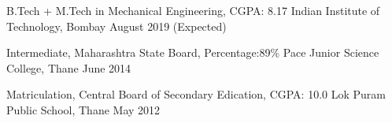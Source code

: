 

\begin{cventries}

  \cventry
    {B.Tech + M.Tech in Mechanical Engineering, CGPA: 8.17} %
    {Indian Institute of Technology, Bombay} %
    {}
    {August 2019 (Expected)} %
    {
    } %

    \cventry
    {Intermediate, Maharashtra State Board, Percentage:89\%} %
    {Pace Junior Science College, Thane} %
    {}
    {June 2014} %
    {
    } %

    \cventry
    {Matriculation, Central Board of Secondary Edication, CGPA: 10.0} %
    {Lok Puram Public School, Thane} %
    {}
    {May 2012} %
    {
    } %
\end{cventries}
